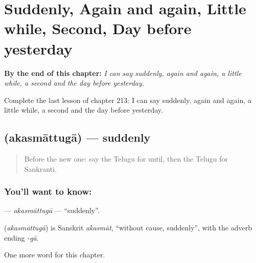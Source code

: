 
\chapter{Suddenly, Again and again, Little while, Second, Day before yesterday}
\label{ch:te-suddenly-again-and-again-little-while-second-day-before-yesterday}

\begin{chapteropening}
\textbf{By the end of this chapter:} \emph{I can say suddenly, again and again, a little while, a second and the day before yesterday.}

Complete the last lesson of chapter 213: I can say suddenly, again and again, a little while, a second and the day before yesterday.
\end{chapteropening}

\section[\texorpdfstring{\te{అకస్మాత్తుగా} (akasmāttugā)}{అకస్మాత్తుగా (akasmāttugā)}]{ (akasmāttugā) — suddenly}

\label{lesson:TE-C213-akasmattuga}



\begin{quote}
Before the new one: say the Telugu for until, then the Telugu for Sankranti.
\end{quote}

\subsection*{You'll want to know: }
\textbf{} — \emph{akasmāttugā} — \textquotedblleft{}suddenly\textquotedblright{}.

\begin{cousinweb}
\textbf{} (\emph{akasmāttugā}) is Sanskrit \emph{akasmāt}, \textquotedblleft{}without cause, suddenly\textquotedblright{}, with the adverb ending \emph{-gā}.
\end{cousinweb}

\begin{grammarlens}[title={What you've built}]
One more word for this chapter.
\end{grammarlens}

